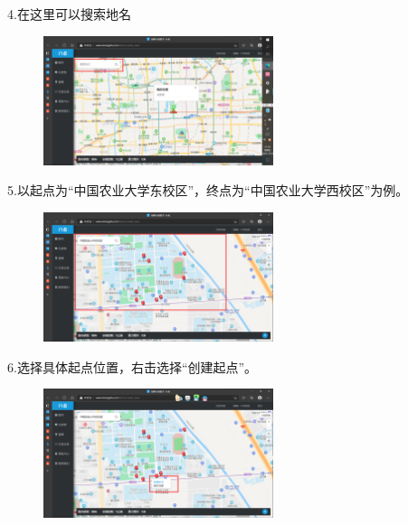 \documentclass{ctexbook}
\begin{document}
4.在这里可以搜索地名
       \begin{figure}[H]
            \begin{center}
            \includegraphics[width=0.6\textwidth]{fig/行者4}
            \end{center}
        \end{figure}

5.以起点为“中国农业大学东校区”，终点为“中国农业大学西校区”为例。
       \begin{figure}[H]
            \begin{center}
            \includegraphics[width=0.6\textwidth]{fig/行者5}
            \end{center}
        \end{figure}

6.选择具体起点位置，右击选择“创建起点”。
       \begin{figure}[H]
            \begin{center}
            \includegraphics[width=0.6\textwidth]{fig/行者6}
            \end{center}
        \end{figure}
\end{document}
